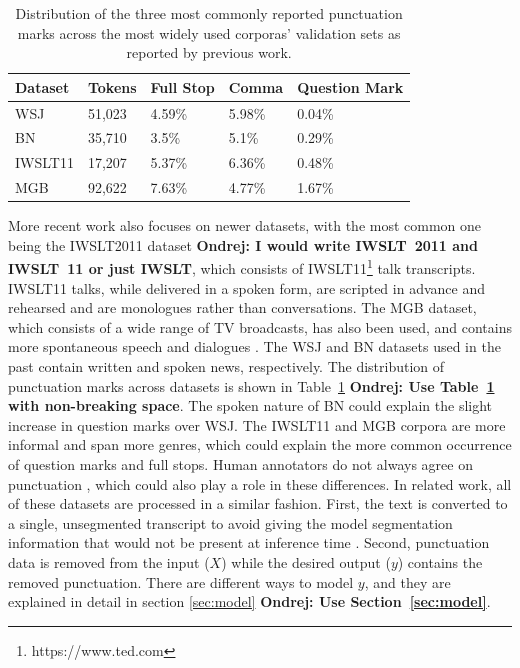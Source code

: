 \documentclass[bsc,deptreport,ai]{infthesis} %
\newcommand{\Ondrej}[1]{{\color{red} \textbf{Ondrej: #1}}}
\begin{document}
\begin{table}[h]
\begin{center}
\begin{sc}
\begin{tabular}{|l|l|lll|}
\hline
\textbf{Dataset} & \textbf{Tokens} & \textbf{Full Stop} & \textbf{Comma} & \textbf{Question Mark} \\ \hline
WSJ              & 51,023          & 4.59\%             & 5.98\%         & 0.04\%                 \\
BN               & 35,710          & 3.5\%              & 5.1\%          & 0.29\%                 \\
IWSLT11              & 17,207          & 5.37\%             & 6.36\%         & 0.48\%                 \\
MGB              & 92,622          & 7.63\%             & 4.77\%         & 1.67\%                 \\ \hline
\end{tabular}
\end{sc}
\end{center}
\caption{Distribution of the three most commonly reported punctuation marks across the most widely used corporas' validation sets as reported by previous work.}
\label{dspunc}
\end{table}
More recent work also focuses on newer datasets, with the most common one being the IWSLT2011 dataset \citep{iwslt2011}\Ondrej{I would write IWSLT~2011 and IWSLT~11 or just IWSLT}, which consists of IWSLT11\footnote{https://www.ted.com} talk transcripts. IWSLT11 talks, while delivered in a spoken form, are scripted in advance and rehearsed and are monologues rather than conversations. The MGB dataset, which consists of a wide range of TV broadcasts, has also been used, and contains more spontaneous speech and dialogues \citep{Bell2015}. The WSJ and BN datasets used in the past contain written and spoken news, respectively. The distribution of punctuation marks across datasets is shown in Table~\ref{dspunc} \Ondrej{Use Table~\ref{dspunc} with non-breaking space}.
The spoken nature of BN could explain the slight increase in question marks over WSJ. The IWSLT11 and MGB corpora are more informal and span more genres, which could explain the more common occurrence of question marks and full stops. Human annotators do not always agree on punctuation \citep{batista2008,interannotator2020}, which could also play a role in these differences. In related work, all of these datasets are processed in a similar fashion. First, the text is converted to a single, unsegmented transcript to avoid giving the model segmentation information that would not be present at inference time \citep{che2016}. Second, punctuation data is removed from the input ($X$) while the desired output ($y$) contains the removed punctuation. There are different ways to model $y$, and they are explained in detail in section \ref{sec:model} \Ondrej{Use Section~\ref{sec:model}}.
\end{document}
